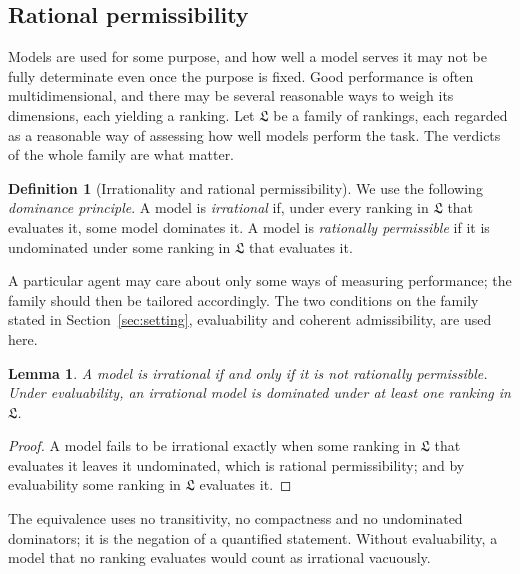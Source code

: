 \documentclass[11pt]{article}
\newtheorem{lemma}[theorem]{Lemma}
\theoremstyle{definition}
\newtheorem{definition}[theorem]{Definition}
\theoremstyle{remark}
\newcommand{\Lf}{\mathfrak L}
\begin{document}
\subsection{Rational permissibility}\label{sec:permissible}
Models are used for some purpose, and how well a model serves it may not be fully determinate even once the purpose is fixed. Good performance is often multidimensional, and there may be several reasonable ways to weigh its dimensions, each yielding a ranking. Let $\Lf$ be a family of rankings, each regarded as a reasonable way of assessing how well models perform the task. The verdicts of the whole family are what matter.

\begin{definition}[Irrationality and rational permissibility]\label{def:permissibility}
We use the following \emph{dominance principle}. A model is \emph{irrational} if, under every ranking in $\Lf$ that evaluates it, some model dominates it. A model is \emph{rationally permissible} if it is undominated under some ranking in $\Lf$ that evaluates it.
\end{definition}

A particular agent may care about only some ways of measuring performance; the family should then be tailored accordingly. The two conditions on the family stated in Section~\ref{sec:setting}, evaluability and coherent admissibility, are used here.

\begin{lemma}\label{lem:complement}
A model is irrational if and only if it is not rationally permissible. Under evaluability, an irrational model is dominated under at least one ranking in $\Lf$.
\end{lemma}
\begin{proof}
A model fails to be irrational exactly when some ranking in $\Lf$ that evaluates it leaves it undominated, which is rational permissibility; and by evaluability some ranking in $\Lf$ evaluates it.
\end{proof}
The equivalence uses no transitivity, no compactness and no undominated dominators; it is the negation of a quantified statement. Without evaluability, a model that no ranking evaluates would count as irrational vacuously.
\end{document}
